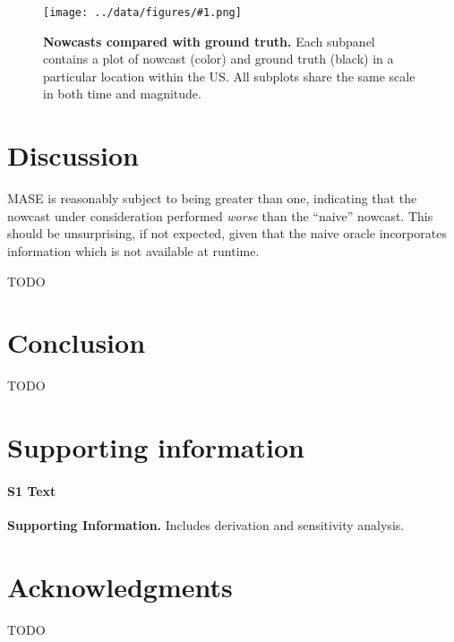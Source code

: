 \documentclass[10pt,letterpaper]{article}
\newcommand{\maybeincludegraphics}[1]{\texttt{[image: ../data/figures/\#1.png]}}
\begin{document}
\begin{figure}[!ht]
  \maybeincludegraphics{all_nowcasts}
  \caption{
    {\bf Nowcasts compared with ground truth.}
    Each subpanel contains a plot of nowcast (color) and ground truth (black)
    in a particular location within the US. All subplots share the same scale
    in both time and magnitude.
  }
  \label{figure_all_nowcasts}
\end{figure}

\section*{Discussion}

MASE is reasonably subject to being greater than one, indicating that the
nowcast under consideration performed \textit{worse} than the ``naive''
nowcast. This should be unsurprising, if not expected, given that the naive
oracle incorporates information which is not available at runtime.

TODO

\section*{Conclusion}

TODO

\section*{Supporting information}

\paragraph*{S1 Text}
\label{S1_Text}
{\bf Supporting Information.} Includes derivation and sensitivity analysis.

\section*{Acknowledgments}

TODO

\nolinenumbers


%
\end{document}
